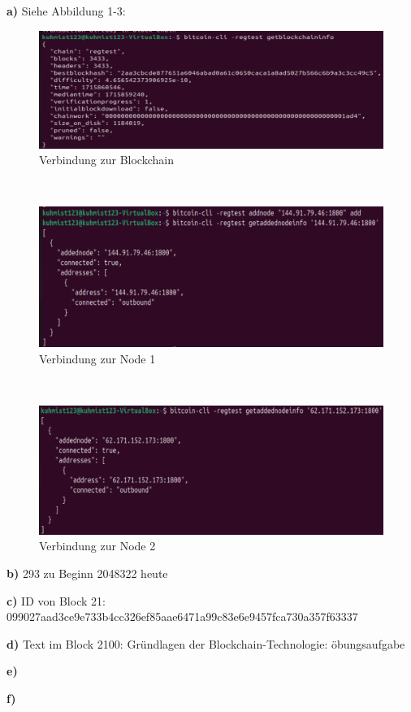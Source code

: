 \documentclass[german]{../uebung}
\begin{document}
\begin{exercise}{1}

    \textbf{a)}
    Siehe Abbildung 1-3:
    \begin{figure}[h]
        \centering
        \includegraphics*[scale=.5]{VerbindungZurBlockchain.png}
        \caption{Verbindung zur Blockchain}
    \end{figure}\\
    \begin{figure}[h]
        \centering
        \includegraphics*[scale=.5]{VerbindungErfolgreich.png}
        \caption{Verbindung zur Node 1}
    \end{figure}\\
    \begin{figure}[h]
        \centering
        \includegraphics*[scale=.5]{Verbindung2.png}
        \caption{Verbindung zur Node 2}
    \end{figure}

    \textbf{b)}
    293 zu Beginn
    2048322 heute


    \textbf{c)}
    ID von Block 21: 099027aad3ce9e733b4cc326ef85aae6471a99c83e6e9457fca730a357f63337

    \textbf{d)}
    Text im Block 2100: Gründlagen der Blockchain-Technologie: öbungsaufgabe

    \textbf{e)}

    \textbf{f)}

\end{exercise}
\end{document}
